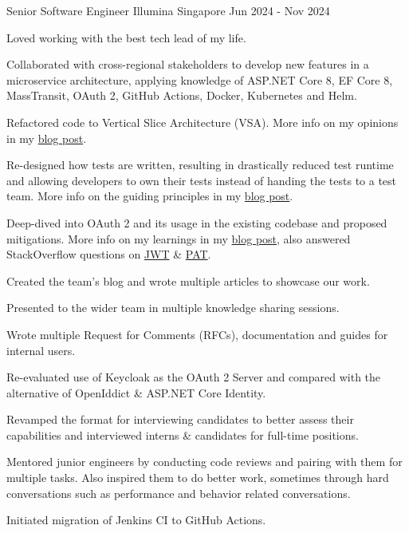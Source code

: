 \begin{cventries}
\cventry
{Senior Software Engineer} %
{Illumina} %
{Singapore} %
{Jun 2024 - Nov 2024} %
{
  \begin{cvitems} %
    \item {Loved working with the best tech lead of my life.}
    \item {Collaborated with cross-regional stakeholders to develop new features in a microservice architecture, applying knowledge of ASP.NET Core 8, EF Core 8, MassTransit, OAuth 2, GitHub Actions, Docker, Kubernetes and Helm.}
    \item {Refactored code to Vertical Slice Architecture (VSA). More info on my opinions in my \href{https://bit.ly/zy-vsa}{blog post}.}
    \item {Re-designed how tests are written, resulting in drastically reduced test runtime and allowing developers to own their tests instead of handing the tests to a test team. More info on the guiding principles in my \href{https://bit.ly/zy-tests}{blog post}.}
    \item {Deep-dived into OAuth 2 and its usage in the existing codebase and proposed mitigations. More info on my learnings in my \href{https://bit.ly/zy-oauth2}{blog post}, also answered StackOverflow questions on \href{https://bit.ly/zy-jwt}{JWT} \& \href{https://bit.ly/zy-pat}{PAT}.}
    \item {Created the team's blog and wrote multiple articles to showcase our work.}
    \item {Presented to the wider team in multiple knowledge sharing sessions.}
    \item {Wrote multiple Request for Comments (RFCs), documentation and guides for internal users.}
    \item {Re-evaluated use of Keycloak as the OAuth 2 Server and compared with the alternative of OpenIddict \& ASP.NET Core Identity.}
    \item {Revamped the format for interviewing candidates to better assess their capabilities and interviewed interns \& candidates for full-time positions.}
    \item {Mentored junior engineers by conducting code reviews and pairing with them for multiple tasks. Also inspired them to do better work, sometimes through hard conversations such as performance and behavior related conversations.}
    \item {Initiated migration of Jenkins CI to GitHub Actions.}
  \end{cvitems}
}


\end{cventries}
